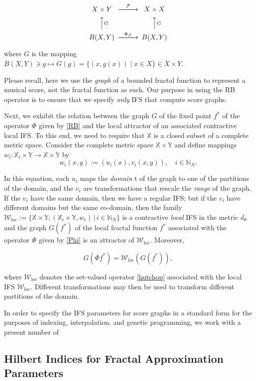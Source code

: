 \documentclass[english,11pt,letterpaper,onecolumn]{scrartcl}
\numberwithin{equation}{section}
\newcommand{\st}{\,|\,}
\newcommand{\N}{\mathbb{N}}
\newcommand{\X}{\mathbb{X}}
\newcommand{\Y}{\mathbb{Y}}
\newcommand{\cF}{\mathcal{F}}
\newcommand{\cW}{\mathcal{W}}
\newcommand{\be}{\begin{equation}}
\newcommand{\ee}{\end{equation}}
\newcommand{\loc}{\mathrm{loc}}
\begin{document}
\be\label{Phi}
\begin{CD}
X\times Y @>\cF>> X\times X\\
@AAGA                  @AAGA\\
B(X,Y) @>\Phi_\cF>>  B(X,Y)
\end{CD}
\ee

\noindent where $G$ is the mapping $B(X,Y)\ni g\longmapsto G(g) = \{(x,
g(x))\mid x\in X\}\in X\times Y$.

Please recall, here we use the \textit{graph} of a bounded fractal function to
represent a musical score, not the fractal function as such. Our purpose in
using the RB operator is to ensure that we specify \textit{only} IFS that
compute score graphs.

Next, we exhibit the relation between the graph $G$ of the fixed point $f^*$ of
the operator $\Phi$ given by \eqref{RB} and the local attractor of an associated
contractive local IFS. To this end, we need to require that $\X$ is a closed
subset of a complete metric space. Consider the complete metric space
$\X\times\Y$ and define mappings $w_i:\X_i\times\Y\to\X\times\Y$ by \[ w_i (x,
y) := (u_i (x), v_i (x,y)), \quad i\in \N_N. \]

In this equation, each $u_i$ maps the \emph{domain} t of the graph to one of the
partitions of the domain, and the $v_i$ are transformations that rescale the
\emph{range} of the graph. If the $v_i$ have the same domain, then we have a
regular IFS; but if the $v_i$ have different domains but the same co-domain,
then the family $\cW_\loc := \{\X\times\Y; (\X_i\times\Y, w_i)\st i\in \N_N\}$
is a contractive \textit{local} IFS in the metric $d_\theta$ and the graph
$G(f^*)$ of the local fractal function $f^*$ associated with the operator $\Phi$
given by \eqref{Phi} is an attractor of $\cW_\loc$. Moreover,

\be\label{GW}
G(\Phi f^*) = \cW_\loc (G(f^*)),
\ee

\noindent where $\cW_\loc$ denotes the set-valued operator \eqref{hutchop}
associated with the local IFS $\cW_\loc$. Different transformations may then be
used to transform different partitions of the domain.

In order to specify the IFS parameters for score graphs in a standard form for
the purposes of indexing, interpolation, and genetic programming, we work with a present number of 

\subsection{Hilbert Indices for Fractal Approximation Parameters}
\end{document}
